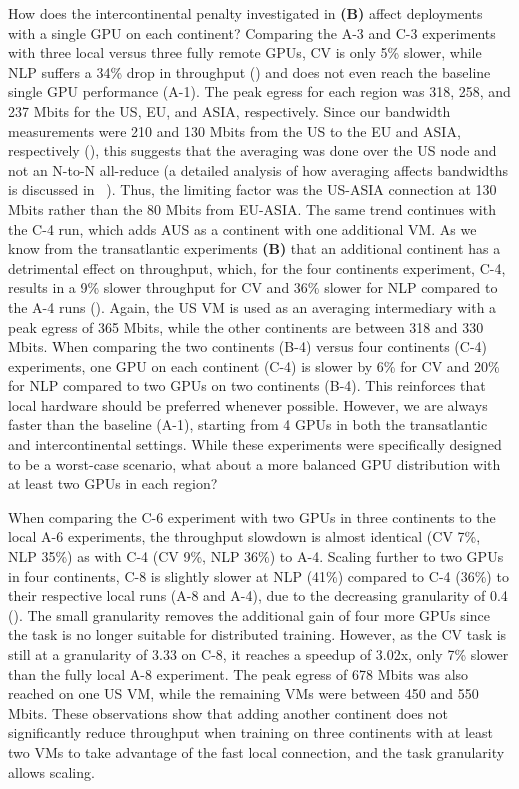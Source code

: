 How does the intercontinental penalty investigated in \textbf{(B)} affect deployments with a single GPU on each continent?
Comparing the A-3 and C-3 experiments with three local versus three fully remote GPUs, CV is only 5\% slower, while NLP suffers a 34\% drop in throughput () and does not even reach the baseline single GPU performance (A-1).
The peak egress for each region was 318, 258, and 237 Mbits for the US, EU, and ASIA, respectively.
Since our bandwidth measurements were 210 and 130 Mbits from the US to the EU and ASIA, respectively (), this suggests that the averaging was done over the US node and not an N-to-N all-reduce (a detailed analysis of how averaging affects bandwidths is discussed in ~).
Thus, the limiting factor was the US-ASIA connection at 130 Mbits rather than the 80 Mbits from EU-ASIA.
The same trend continues with the C-4 run, which adds AUS as a continent with one additional VM.
As we know from the transatlantic experiments \textbf{(B)} that an additional continent has a detrimental effect on throughput, which, for the four continents experiment, C-4, results in a 9\% slower throughput for CV and 36\% slower for NLP compared to the A-4 runs ().
Again, the US VM is used as an averaging intermediary with a peak egress of 365 Mbits, while the other continents are between 318 and 330 Mbits.
When comparing the two continents (B-4) versus four continents (C-4) experiments, one GPU on each continent (C-4) is slower by 6\% for CV and 20\% for NLP compared to two GPUs on two continents (B-4).
This reinforces that local hardware should be preferred whenever possible.
However, we are always faster than the baseline (A-1), starting from 4 GPUs in both the transatlantic and intercontinental settings.
While these experiments were specifically designed to be a worst-case scenario, what about a more balanced GPU distribution with at least two GPUs in each region?

When comparing the C-6 experiment with two GPUs in three continents to the local A-6 experiments, the throughput slowdown is almost identical (CV 7\%, NLP 35\%) as with C-4 (CV 9\%, NLP 36\%) to A-4.
Scaling further to two GPUs in four continents, C-8 is slightly slower at NLP (41\%) compared to C-4 (36\%) to their respective local runs (A-8 and A-4), due to the decreasing granularity of 0.4 ().
The small granularity removes the additional gain of four more GPUs since the task is no longer suitable for distributed training.
However, as the CV task is still at a granularity of 3.33 on C-8, it reaches a speedup of 3.02x, only 7\% slower than the fully local A-8 experiment.
The peak egress of 678 Mbits was also reached on one US VM, while the remaining VMs were between 450 and 550 Mbits.
These observations show that adding another continent does not significantly reduce throughput when training on three continents with at least two VMs to take advantage of the fast local connection, and the task granularity allows scaling.

